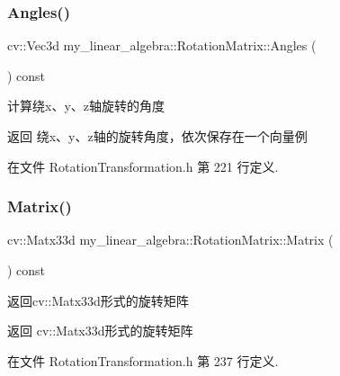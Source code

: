 \subsubsection{\texorpdfstring{Angles()}{Angles()}}
{\footnotesize\ttfamily cv\+::\+Vec3d my\+\_\+linear\+\_\+algebra\+::\+Rotation\+Matrix\+::\+Angles (\begin{DoxyParamCaption}{ }\end{DoxyParamCaption}) const\hspace{0.3cm}{\ttfamily [inline]}}



计算绕x、y、z轴旋转的角度 

\begin{DoxyReturn}{返回}
绕x、y、z轴的旋转角度，依次保存在一个向量例 
\end{DoxyReturn}


在文件 Rotation\+Transformation.\+h 第 221 行定义.

\mbox{\label{classmy__linear__algebra_1_1_rotation_matrix_a546939fe80b057e325042b35bd0b0a57}} 
\subsubsection{\texorpdfstring{Matrix()}{Matrix()}}
{\footnotesize\ttfamily cv\+::\+Matx33d my\+\_\+linear\+\_\+algebra\+::\+Rotation\+Matrix\+::\+Matrix (\begin{DoxyParamCaption}{ }\end{DoxyParamCaption}) const\hspace{0.3cm}{\ttfamily [inline]}}



返回cv\+::\+Matx33d形式的旋转矩阵 

\begin{DoxyReturn}{返回}
cv\+::\+Matx33d形式的旋转矩阵 
\end{DoxyReturn}


在文件 Rotation\+Transformation.\+h 第 237 行定义.

\mbox{\label{classmy__linear__algebra_1_1_rotation_matrix_aff450dadd4a37acb67171ba76832300f}} 
